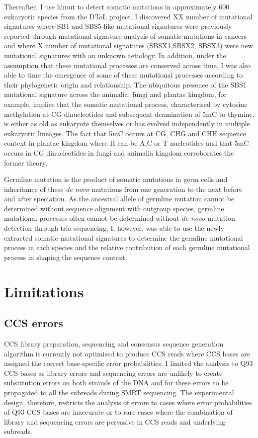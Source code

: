 Thereafter, I use himut to detect somatic mutations in approximately 600 eukaryotic species from the DToL project. I discovered XX number of mutational signatures where SB1 and SBS5-like mutational signatures were previously reported through mutational signature analysis of somatic mutations in cancers \cite{} and where X number of mutational signatures (SBSX1,SBSX2, SBSX3) were new mutational signatures with an unknown aetiology. In addition, under the assumption that these mutational processes are conserved across time, I was also able to time the emergence of some of these mutational processes according to their phylogenetic origin and relationship. The ubiquitous presence of the SBS1 mutational signature across the animalia, fungi and plantae kingdom, for example, implies that the somatic mutational process, characterised by cytosine methylation at CG dinucleotides and subsequent deamination of 5mC to thymine, is either as old as eukaryote themselves or has evolved independently in multiple eukaryotic lineages. The fact that 5mC occurs at CG, CHG and CHH sequence context in plantae kingdom where H can be A,C or T nucleotides \cite{} and that 5mC occurs in CG dinucleotides in fungi and animalia kingdom \cite{} corroborates the former theory. 

Germline mutation is the product of somatic mutations in germ cells and inheritance of these \textit{de novo} mutations from one generation to the next before and after speciation. As the ancestral allele of germline mutation cannot be determined without sequence alignment with outgroup species, germline mutational processes often cannot be determined without \textit{de novo} mutation detection through trio-sequencing. I, however, was able to use the newly extracted somatic mutational signatures to determine the germline mutational process in each species and the relative contribution of each germline mutational process in shaping the sequence context.

\section{Limitations}
 
\subsection{CCS errors}
 
CCS library preparation, sequencing and consensus sequence generation algorithm is currently not optimised to produce CCS reads where CCS bases are assigned the correct base-specific error probabilities. I limited the analysis to Q93 CCS bases as library errors and sequencing errors are unlikely to create substitution errors on both strands of the DNA and for these errors to be propagated to all the subreads during SMRT sequencing. The experimental design, therefore, restricts the analysis of errors to cases where error probabilities of Q93 CCS bases are inaccurate or to rare cases where the combination of library and sequencing errors are pervasive in CCS reads and underlying subreads.
 
